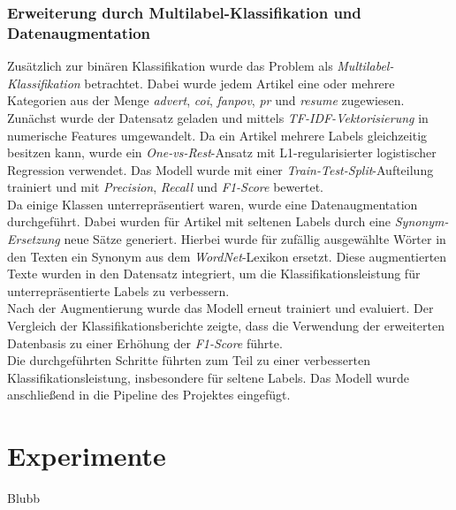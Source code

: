 \documentclass[researchlab,palatino]{AIGpaper}
\begin{document}
\subsubsection{Erweiterung durch Multilabel-Klassifikation und Datenaugmentation}
Zusätzlich zur binären Klassifikation wurde das Problem als \textit{Multilabel-Klassifikation} betrachtet. Dabei wurde jedem Artikel eine oder mehrere Kategorien aus der Menge \textit{advert}, \textit{coi}, \textit{fanpov}, \textit{pr} und \textit{resume} zugewiesen. \\
Zunächst wurde der Datensatz geladen und mittels \textit{TF-IDF-Vektorisierung} in numerische Features umgewandelt. Da ein Artikel mehrere Labels gleichzeitig besitzen kann, wurde ein \textit{One-vs-Rest}-Ansatz mit L1-regularisierter logistischer Regression verwendet. Das Modell wurde mit einer \textit{Train-Test-Split}-Aufteilung trainiert und mit \textit{Precision}, \textit{Recall} und \textit{F1-Score} bewertet.\\
Da einige Klassen unterrepräsentiert waren, wurde eine Datenaugmentation durchgeführt. Dabei wurden für Artikel mit seltenen Labels durch eine \textit{Synonym-Ersetzung} neue Sätze generiert. Hierbei wurde für zufällig ausgewählte Wörter in den Texten ein Synonym aus dem \textit{WordNet}-Lexikon ersetzt. Diese augmentierten Texte wurden in den Datensatz integriert, um die Klassifikationsleistung für unterrepräsentierte Labels zu verbessern.\\
Nach der Augmentierung wurde das Modell erneut trainiert und evaluiert. Der Vergleich der Klassifikationsberichte zeigte, dass die Verwendung der erweiterten Datenbasis zu einer Erhöhung der \textit{F1-Score} führte.\\
Die durchgeführten Schritte führten zum Teil zu einer verbesserten Klassifikationsleistung, insbesondere für seltene Labels. Das Modell wurde anschließend in die Pipeline des Projektes eingefügt.


\section{Experimente}
Blubb
\end{document}
